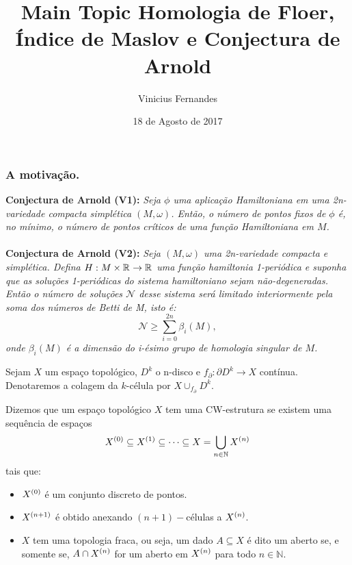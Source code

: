 \documentclass{beamer}
\title[Short title]{Main Topic } %
\author{Vinicius Fernandes}
\title{Homologia de Floer, Índice de Maslov e Conjectura de Arnold}
\institute{Universidade Federal do ABC}
\date{18 de Agosto de 2017}
\begin{document}
	
	\begin{frame}
		\titlepage %
	\end{frame}
	
	\begin{frame}
		\frametitle{
			A motivação.}
		\textbf{Conjectura de Arnold (V1):} \textit{Seja $\phi$ uma aplicação Hamiltoniana em uma 2n-variedade compacta simplética $(M, \omega)$. Então, o número de pontos fixos de $\phi$ é, no mínimo, o número de pontos críticos de uma função Hamiltoniana em $M$.}
		\\~\\
		
		\pause	
		\textbf{Conjectura de Arnold (V2):} \textit	{Seja $(M,\omega)$ uma 2n-variedade compacta e simplética. Defina  $H:M\times \mathbb{R}^{} \to \mathbb{R}^{}$  uma função hamiltonia 1-periódica e suponha que as soluções 1-periódicas do sistema hamiltoniano sejam não-degeneradas. Então o número de soluções $\mathcal{N}$ desse sistema será limitado interiormente pela soma dos números de Betti de M, isto é:
			$$
			\mathcal{N}\geq \sum_{i=0}^{2n}\beta_{i}(M),
			$$
			onde $\beta_{i}(M)$ é a dimensão do i-ésimo grupo de homologia singular de $M$.}
	\end{frame}
	
	\begin{frame}
		
		\begin{definicao}
			Sejam $X$ um espaço topológico, $D^{k}$ o n-disco e $f_{\partial}:\partial D^{k} \to X$ contínua. Denotaremos a colagem da $k$-célula por $X\cup_{f_{\partial}}D^{k}$.
		\end{definicao}
		
		\begin{definicao}[CW-complexo]
			Dizemos que um espaço topológico $X$ tem uma CW-estrutura se existem uma sequência de espaços
			$$
			X^{(0)} \subseteq X^{(1)} \subseteq \dots \subseteq X = \bigcup \limits_{n\in \mathbb{N}} X^{(n)}
			$$ 
			tais que:
			\begin{itemize}
				\item $X^{(0)}$ é um conjunto discreto de pontos.
				
				\item $X^{(n+1)}$ é obtido anexando $(n+1)-$células a $X^{(n)}$.
				
				\item $X$ tem uma topologia fraca, ou seja, um dado $A \subseteq X$ é dito um aberto se, e somente se, $A \cap X^{(n)}$ for um aberto em $X^{(n)}$ para todo $n \in \mathbb{N}$.
			\end{itemize}
		\end{definicao}
	\end{frame}
	
\end{document}

